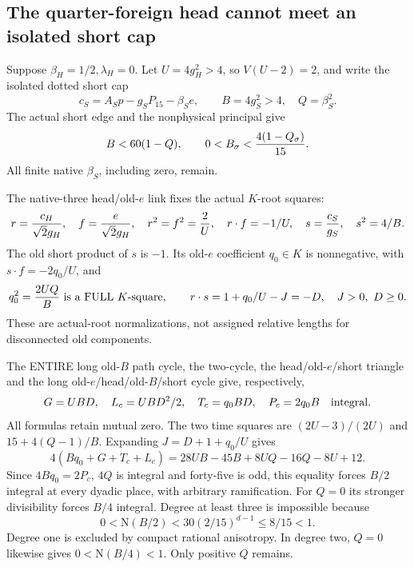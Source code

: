 \documentclass[11pt]{article}
\begin{document}
\subsection{The quarter-foreign head cannot meet an isolated short cap}
\label{app:arithB15Iquarter}

Suppose \(\beta_H=1/2,\lambda_H=0\).
Let \(U=4g_H^2>4\), so \(V(U-2)=2\), and write the
isolated dotted short cap
\[
 c_S=A_Sp-g_SP_{15}-\beta_Se,\qquad
 B=4g_S^2>4,\quad Q=\beta_S^2.
\]
The actual short edge and the nonphysical principal give
\[
 B<60(1-Q),\qquad
 0<B_\sigma<{4(1-Q_\sigma)\over15}.
\]
All finite native \(\beta_S\), including zero, remain.

The native-three head/old-\(e\) link fixes the actual
\(K\)-root squares:
\[
 r={c_H\over\sqrt2g_H},\quad f={e\over\sqrt2g_H},
 \quad r^2=f^2={2\over U},\quad r\cdot f=-1/U,\quad
 s={c_S\over g_S},\quad s^2=4/B .
\]
The old short product of \(s\) is \(-1\).
Its old-\(e\) coefficient \(q_0\in K\) is nonnegative,
with \(s\cdot f=-2q_0/U\), and
\[
 q_0^2={2UQ\over B}\text{ is a FULL }K\text{-square},\qquad
 r\cdot s=1+q_0/U-J=-D,\quad J>0,\ D\ge0 .
\]
These are actual-root normalizations, not assigned
relative lengths for disconnected old components.

The ENTIRE long old-\(B\) path cycle, the two-cycle,
the head/old-\(e\)/short triangle and the long
old-\(e\)/head/old-\(B\)/short cycle give, respectively,
\[
              G=UBD,\quad L_c=UBD^2/2,\quad
              T_c=q_0BD,\quad P_c=2q_0B
                         \quad\hbox{integral}.
\]
All formulas retain mutual zero.
The two time squares are
\((2U-3)/(2U)\) and \(15+4(Q-1)/B\).
Expanding \(J=D+1+q_0/U\) gives
\[
 4(Bq_0+G+T_c+L_c)
       =28UB-45B+8UQ-16Q-8U+12 .
\tag{BQ2}\label{eq:arithB15Iquarterparity}
\]
Since \(4Bq_0=2P_c\), \(4Q\) is integral and
forty-five is odd, this equality forces \(B/2\)
integral at every dyadic place, with arbitrary
ramification.
For \(Q=0\) its stronger divisibility forces \(B/4\)
integral.
Degree at least three is impossible because
\[
                 0<\mathrm N(B/2)
                       <30(2/15)^{d-1}\le8/15<1 .
\]
Degree one is excluded by compact rational anisotropy.
In degree two, \(Q=0\) likewise gives
\(0<\mathrm N(B/4)<1\).
Only positive \(Q\) remains.
\end{document}
